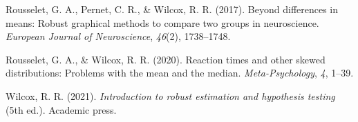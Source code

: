 \documentclass[
  man, donotrepeattitle,floatsintext]{apa7}
\newlength{\cslhangindent}
\newlength{\cslentryspacingunit} %
\newenvironment{CSLReferences}[2] %
 {%
  \setlength{\parindent}{0pt}
  \ifodd #1
  \let\oldpar\par
  \def\par{\hangindent=\cslhangindent\oldpar}
  \fi
  \setlength{\parskip}{#2\cslentryspacingunit}
 }%
 {}
\begin{document}
\begin{CSLReferences}{1}{0}
\leavevmode{}%
Rousselet, G. A., Pernet, C. R., \& Wilcox, R. R. (2017). Beyond differences in means: Robust graphical methods to compare two groups in neuroscience. \emph{European Journal of Neuroscience}, \emph{46}(2), 1738--1748.

\leavevmode{}%
Rousselet, G. A., \& Wilcox, R. R. (2020). Reaction times and other skewed distributions: Problems with the mean and the median. \emph{Meta-Psychology}, \emph{4}, 1--39.

\leavevmode{}%
Wilcox, R. R. (2021). \emph{Introduction to robust estimation and hypothesis testing} (5th ed.). Academic press.

\end{CSLReferences}
\end{document}
